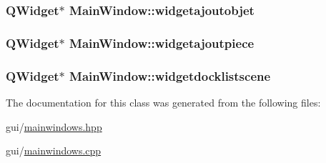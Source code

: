 \hypertarget{class_main_window_a0d183b04e212e26798d316d9f6125f97}{
\subsubsection[{widgetajoutobjet}]{\setlength{\rightskip}{0pt plus 5cm}Q\+Widget$\ast$ Main\+Window\+::widgetajoutobjet\hspace{0.3cm}{\ttfamily [private]}}}\label{class_main_window_a0d183b04e212e26798d316d9f6125f97}
\hypertarget{class_main_window_a81a3c7e272f0bc32762ef85575fe271d}{
\subsubsection[{widgetajoutpiece}]{\setlength{\rightskip}{0pt plus 5cm}Q\+Widget$\ast$ Main\+Window\+::widgetajoutpiece\hspace{0.3cm}{\ttfamily [private]}}}\label{class_main_window_a81a3c7e272f0bc32762ef85575fe271d}
\hypertarget{class_main_window_a38d553a96a3898e65b500c639673b8de}{
\subsubsection[{widgetdocklistscene}]{\setlength{\rightskip}{0pt plus 5cm}Q\+Widget$\ast$ Main\+Window\+::widgetdocklistscene\hspace{0.3cm}{\ttfamily [private]}}}\label{class_main_window_a38d553a96a3898e65b500c639673b8de}


The documentation for this class was generated from the following files\+:\begin{DoxyCompactItemize}
\item 
gui/\hyperlink{mainwindows_8hpp}{mainwindows.\+hpp}\item 
gui/\hyperlink{mainwindows_8cpp}{mainwindows.\+cpp}\end{DoxyCompactItemize}
